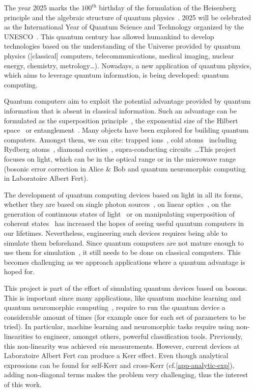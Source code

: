 The year 2025 marks the $100^{\text{th}}$ birthday of the formulation of the Heisenberg principle and the algebraic structure of quantum physics~\cite{history_quantum}. 2025 will be celebrated as the International Year of Quantum Science and Technology organized by the UNESCO~\cite{webpage_quantum_2025}. This quantum century has allowed humankind to develop technologies based on the understanding of the Universe provided by quantum physics ([classical] computers, telecommunications, medical imaging, nuclear energy, chemistry, metrology\ldots). Nowadays, a new application of quantum physics, which aims to leverage quantum information, is being developed: quantum computing.

Quantum computers aim to exploit the potential advantage provided by quantum information that is absent in classical information. Such an advantage can be formulated as the superposition principle~\cite{superposition_time}, the exponential size of the Hilbert space~\cite{schuld} or entanglement~\cite{aspect1982experimental}. Many objects have been explored for building quantum computers. Amongst them, we can cite: trapped ions~\cite{nature_atomic_qubits, compact_ion_trap, explo_quant}, cold atoms~\cite{Book-Lukacs} including Rydberg atoms~\cite{quantum_opti_rydberg}, diamond cavities~\cite{diamond}, supra-conducting circuits~\cite{google-supra, bbn-supra}\ldots This project focuses on light, which can be in the optical range or in the microwave range  (bosonic error correction in Alice \& Bob and quantum neuromorphic computing in Laboratoire Albert Fert).

The development of quantum computing devices based on light in all its forms, whether they are based on single photon sources~\cite{pascale_nature}, on linear optics~\cite{rawad_quandela}, on the generation of continuous states of light~\cite{review_xanadu} or on manipulating superposition of coherent states~\cite{elie_cat} has increased the hopes of seeing useful quantum computers in our lifetimes. Nevertheless, engineering such devices requires being able to simulate them beforehand. Since quantum computers are not mature enough to use them for simulation~\cite{feynman2018simulating}, it still needs to be done on classical computers. This becomes challenging as we approach applications where a quantum advantage is hoped for.

This project is part of the effort of simulating quantum devices based on bosons. This is important since many applications, like quantum machine learning and quantum neuromorphic computing~\cite{taha_quandela, markovic2020physics, Dudas2023-xx}, require to run the quantum device a considerable amount of times (for example once for each set of parameters to be tried). In particular, machine learning and neuromorphic tasks require using non-linearities to engineer, amongst others, powerful classification tools. Previously, this non-linearity was achieved \textit{via} measurements. However, current devices at Laboratoire Albert Fert can produce a Kerr effect. Even though analytical expressions can be found for self-Kerr and cross-Kerr (cf.\@ \autoref{app-analytic-exp}), adding non-diagonal terms makes the problem very challenging, thus the interest of this work. 


